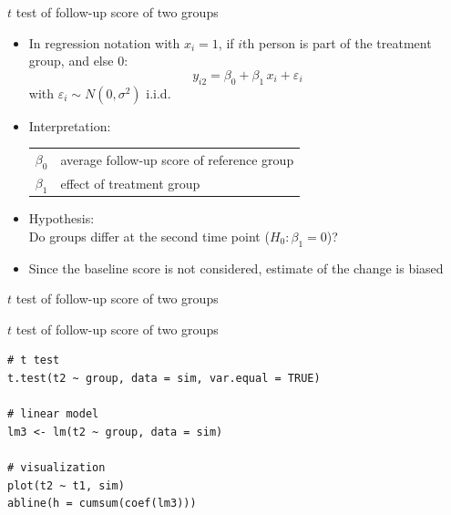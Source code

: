 \documentclass[aspectratio=169]{beamer}
\begin{document}
\begin{frame}{$t$ test of follow-up score of two groups}
\begin{itemize}
  \item In regression notation with $x_i = 1$, if $i$th person is part of
    the treatment group, and else $0$:
    \[
      y_{i2} = \beta_0 + \beta_1 \, x_i + \varepsilon_i
    \]
    with $\varepsilon_i \sim N(0, \sigma^2)$ i.i.d.
  \item Interpretation:
    \begin{center}
    \begin{tabular}{ll}
    $\beta_0$ & average follow-up score of reference group\\
    $\beta_1$ & effect of treatment group
    \end{tabular}
    \end{center}
  \item Hypothesis:\\
        Do groups differ at the second time point ($H_0\colon \beta_1 = 0$)?
  \item Since the baseline score is not considered, estimate of the change
    is biased
\end{itemize}
\end{frame}


\begin{frame}{$t$ test of follow-up score of two groups}
\begin{center}
\end{center}
\end{frame}

\begin{frame}[fragile]{$t$ test of follow-up score of two groups}
\begin{lstlisting}
# t test
t.test(t2 ~ group, data = sim, var.equal = TRUE)

# linear model
lm3 <- lm(t2 ~ group, data = sim)

# visualization
plot(t2 ~ t1, sim)
abline(h = cumsum(coef(lm3)))
\end{lstlisting}
\end{frame}
\end{document}
